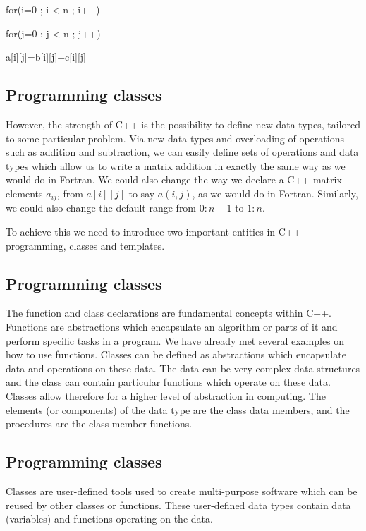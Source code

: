 \documentclass[%
oneside,                 %
final,                   %
10pt]{article}
\begin{document}
{{{{{{{{{{{\bcppcod
   for(i=0 ; i < n ; i++) {
      for(j=0 ; j < n ; j++) {
         a[i][j]=b[i][j]+c[i][j]

\ecppcod

\subsection{Programming classes}

However,
the strength of C++ is the possibility
to define new data types, tailored to some particular problem.
Via new data types and overloading of operations such as addition and subtraction, we can easily define
sets of operations and data types which allow us to write a matrix addition in exactly the same
way as we would do in Fortran.  We could also change the way we declare a C++ matrix elements $a_{ij}$, from  $a[i][j]$
to say $a(i,j)$, as we would do in Fortran. Similarly, we could also change the default range from $0:n-1$ to $1:n$.

To achieve this we need to introduce two important entities in C++ programming, classes and templates.

\subsection{Programming classes}

The function and class declarations are fundamental concepts within C++.  Functions are abstractions
which encapsulate an algorithm or parts of it and perform specific tasks in a program.
We have already met several examples on how to use  functions.
Classes can be defined as abstractions which encapsulate
data and operations on these data.
The data can be very complex data structures  and the class can contain particular functions
which operate on these data. Classes allow therefore for a higher level of abstraction in computing.
The elements (or components) of the data
type are the class data members, and the procedures are the class
member functions.

\subsection{Programming classes}

Classes are user-defined tools used to create multi-purpose software which can be reused by other classes or functions.
These user-defined data types contain data (variables) and
functions operating on the data.

}}}}}}}}}}}}}
\end{document}
